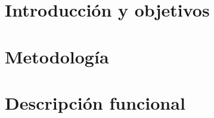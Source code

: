 \documentclass[12pt,twoside,titlepage]{report}
\begin{document}






\pagestyle{fancy}


\renewcommand{\chaptermark}[1]{\markboth{Capítulo \thechapter.\ #1}{}}

\pagestyle{fancy}
\fancyhf{}
\fancyhead[LO]{\leftmark}
\fancyhead[RO]{}
\fancyhead[RE]{\nouppercase\rightmark}
\fancyhead[LE]{}
\fancyfoot[C]{\thepage}









\pagestyle{fancy}

\setlength{\parskip}{0.75em}
\renewcommand{\baselinestretch}{1.25}


\chapter{Introducción y objetivos}

\setcounter{page}{1}




\blankpage


\chapter{Metodología}
\setcounter{page}{8}


\blankpage

\chapter{Descripción funcional}
\setcounter{page}{10}

\end{document}

